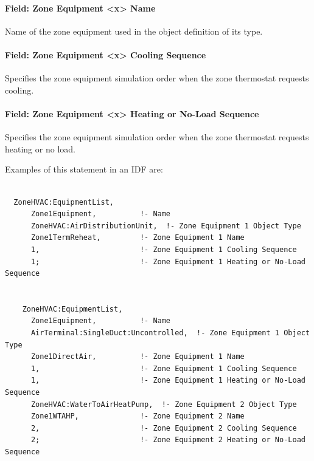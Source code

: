 \paragraph{Field: Zone Equipment \textless{}x\textgreater{} Name}\label{field-zone-equipment-x-name}

Name of the zone equipment used in the object definition of its type.

\paragraph{Field: Zone Equipment \textless{}x\textgreater{} Cooling Sequence}\label{field-zone-equipment-x-cooling-sequence}

Specifies the zone equipment simulation order when the zone thermostat requests cooling.

\paragraph{Field: Zone Equipment \textless{}x\textgreater{} Heating or No-Load Sequence}\label{field-zone-equipment-x-heating-or-no-load-sequence}

Specifies the zone equipment simulation order when the zone thermostat requests heating or no load.

Examples of this statement in an IDF are:

\begin{lstlisting}

  ZoneHVAC:EquipmentList,
      Zone1Equipment,          !- Name
      ZoneHVAC:AirDistributionUnit,  !- Zone Equipment 1 Object Type
      Zone1TermReheat,         !- Zone Equipment 1 Name
      1,                       !- Zone Equipment 1 Cooling Sequence
      1;                       !- Zone Equipment 1 Heating or No-Load Sequence


    ZoneHVAC:EquipmentList,
      Zone1Equipment,          !- Name
      AirTerminal:SingleDuct:Uncontrolled,  !- Zone Equipment 1 Object Type
      Zone1DirectAir,          !- Zone Equipment 1 Name
      1,                       !- Zone Equipment 1 Cooling Sequence
      1,                       !- Zone Equipment 1 Heating or No-Load Sequence
      ZoneHVAC:WaterToAirHeatPump,  !- Zone Equipment 2 Object Type
      Zone1WTAHP,              !- Zone Equipment 2 Name
      2,                       !- Zone Equipment 2 Cooling Sequence
      2;                       !- Zone Equipment 2 Heating or No-Load Sequence
\end{lstlisting}
